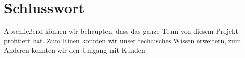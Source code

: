 \section{Schlusswort}
Abschließend können wir behaupten, dass das ganze Team von diesem Projekt profitiert hat. Zum Einen konnten
wir unser technisches Wissen erweitern, zum Anderen konnten wir den Umgang mit Kunden